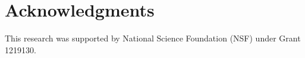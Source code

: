 \documentclass[journal,10pt]{IEEEtran}
\begin{document}
\section*{Acknowledgments}
This research was supported by National Science Foundation (NSF) under Grant 1219130.
 






\ifCLASSOPTIONcaptionsoff
  \newpage
\fi
\newpage


\end{document}
